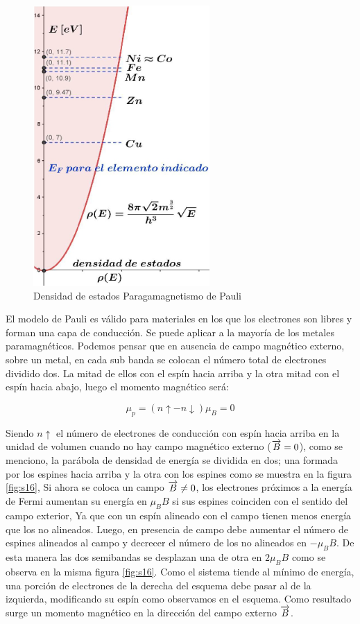 \begin{figure}[H]
    \centering
    \includegraphics[width=0.6\textwidth]{./Figures/fig_s15}
	\caption{Densidad de estados Paragamagnetismo de Pauli}
	\label{fig:s15}
\end{figure}

El modelo de Pauli es válido para materiales en los que los electrones son libres y forman una capa de conducción. Se puede aplicar a la mayoría de los metales paramagnéticos. Podemos pensar que en ausencia de campo magnético externo, sobre un metal, en cada sub banda se colocan el número total de electrones dividido dos. La mitad de ellos con el espín hacia arriba y la otra mitad con el espín hacia abajo, luego el momento magnético será:

\begin{equation}
	\mu_{p}= (n\uparrow - n\downarrow)\mu_{B} = 0
\end{equation}

Siendo $n\uparrow$ el número de electrones de conducción con espín hacia arriba en la unidad de volumen cuando no hay campo magnético externo ($\overrightarrow{B}=0$), como se menciono, la parábola de densidad de energía se dividida en dos; una formada por los espines hacia arriba y la otra con los espines como se muestra en la figura \ref{fig:s16}, Si ahora se coloca un campo $\overrightarrow{B}\neq 0$, los electrones próximos a la energía de Fermi aumentan su energía en $\mu_{B}B$ si sus espines coinciden con el sentido del campo exterior, Ya que con un espín alineado con el campo tienen menos energía que los no
alineados. Luego, en presencia de campo debe aumentar el número de espines alineados al campo y decrecer el número de los no alineados en  $-\mu_{B}B$. De esta manera las dos semibandas se desplazan una de otra en  $2\mu_{B}B$ como se observa en la misma figura \ref{fig:s16}. Como el sistema tiende al mínimo de energía, una porción de electrones de la derecha del esquema debe pasar al de la izquierda, modificando su espín como observamos en el esquema. Como resultado surge un momento magnético en la dirección del campo externo $\overrightarrow{B}$.

